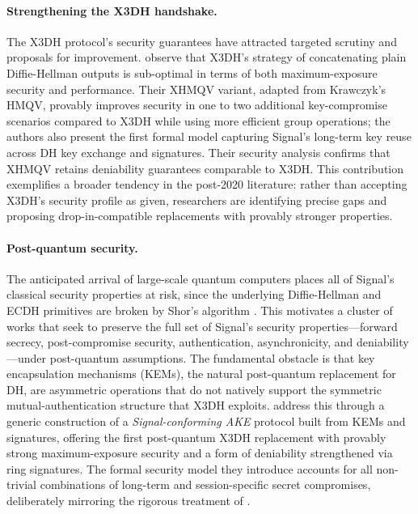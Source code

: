 \paragraph{Strengthening the X3DH handshake.}
The X3DH protocol's security guarantees have attracted targeted scrutiny and proposals for improvement. \textcite{fiedler2025} observe that X3DH's strategy of concatenating plain Diffie-Hellman outputs is sub-optimal in terms of both maximum-exposure security and performance. Their XHMQV variant, adapted from Krawczyk's HMQV, provably improves security in one to two additional key-compromise scenarios compared to X3DH while using more efficient group operations; the authors also present the first formal model capturing Signal's long-term key reuse across DH key exchange and signatures. Their security analysis confirms that XHMQV retains deniability guarantees comparable to X3DH. This contribution exemplifies a broader tendency in the post-2020 literature: rather than accepting X3DH's security profile as given, researchers are identifying precise gaps and proposing drop-in-compatible replacements with provably stronger properties.

\paragraph{Post-quantum security.}
The anticipated arrival of large-scale quantum computers places all of Signal's classical security properties at risk, since the underlying Diffie-Hellman and ECDH primitives are broken by Shor's algorithm \parencite{sharma2023}. This motivates a cluster of works that seek to preserve the full set of Signal's security properties—forward secrecy, post-compromise security, authentication, asynchronicity, and deniability—under post-quantum assumptions. The fundamental obstacle is that key encapsulation mechanisms (KEMs), the natural post-quantum replacement for DH, are asymmetric operations that do not natively support the symmetric mutual-authentication structure that X3DH exploits. \textcite{hashimoto2021,hashimoto2022} address this through a generic construction of a \emph{Signal-conforming AKE} protocol built from KEMs and signatures, offering the first post-quantum X3DH replacement with provably strong maximum-exposure security and a form of deniability strengthened via ring signatures. The formal security model they introduce accounts for all non-trivial combinations of long-term and session-specific secret compromises, deliberately mirroring the rigorous treatment of \textcite{cohn-gordon2020}.

